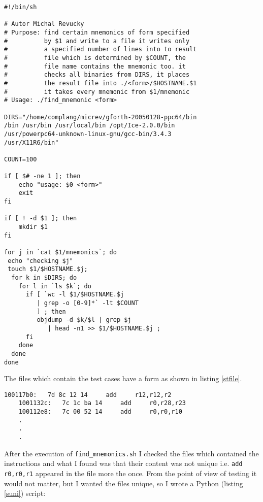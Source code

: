 \begin{lstlisting}[float, caption=Script: find\_mnemonics.sh, label=smnems]
#!/bin/sh

# Autor Michal Revucky
# Purpose: find certain mnemonics of form specified 
#          by $1 and write to a file it writes only
#          a specified number of lines into to result
#          file which is determined by $COUNT, the 
#          file name contains the mnemonic too. it 
#          checks all binaries from DIRS, it places 
#          the result file into ./<form>/$HOSTNAME.$1
#          it takes every mnemonic from $1/mnemonic
# Usage: ./find_mnemonic <form>

DIRS="/home/complang/micrev/gforth-20050128-ppc64/bin 
/bin /usr/bin /usr/local/bin /opt/Ice-2.0.0/bin
/usr/powerpc64-unknown-linux-gnu/gcc-bin/3.4.3 
/usr/X11R6/bin"

COUNT=100

if [ $# -ne 1 ]; then 
    echo "usage: $0 <form>"
    exit
fi

if [ ! -d $1 ]; then 
    mkdir $1
fi

for j in `cat $1/mnemonics`; do
 echo "checking $j"
 touch $1/$HOSTNAME.$j;
  for k in $DIRS; do
    for l in `ls $k`; do
      if [ `wc -l $1/$HOSTNAME.$j 
         | grep -o [0-9]*` -lt $COUNT 
         ] ; then 
         objdump -d $k/$l | grep $j 
            | head -n1 >> $1/$HOSTNAME.$j ;
      fi
    done
  done
done
\end{lstlisting}

The files which contain the test cases have a form as shown in listing 
\ref{stfile}.

\begin{lstlisting}[float, caption=Example of a test file, label=stfile]
    100117b0:   7d 8c 12 14     add     r12,r12,r2
    1001132c:   7c 1c ba 14     add     r0,r28,r23
    100112e8:   7c 00 52 14     add     r0,r0,r10
    .
    .
    .
\end{lstlisting}

After the execution of \texttt{find\_mnemonics.sh} I checked the files which
contained the instructions and what I found was that their content was not
unique i.e. \texttt{add r0,r0,r1} appeared in the file more the once. From the
point of view of testing it would not matter, but I wanted the files unique, so
I wrote a Python (listing \ref{suni}) script:

